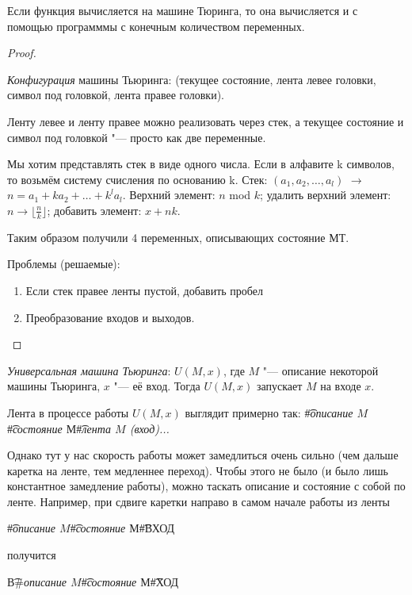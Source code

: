 \begin{theorem}
	Если функция вычисляется на машине Тюринга, то она вычисляется и с помощью программмы с конечным количеством переменных.
\end{theorem}
\begin{proof}
	\begin{Def}
		\textit{Конфигурация} машины Тьюринга: (текущее состояние, лента левее головки, символ под головкой, лента правее головки).
	\end{Def}

	Ленту левее и ленту правее можно реализовать через стек, а текущее состояние и символ под головкой "--- просто как две переменные.

	Мы хотим представлять стек в виде одного числа.
	Если в алфавите k символов, то возьмём систему счисления по основанию k.
	Стек: $(a_1, a_2, \dots, a_l)$ $\longrightarrow$ $n = a_1 + ka_2 + \dots + k^la_l$. Верхний элемент: $n$ mod $k$; удалить верхний элемент: 
	$n \longrightarrow \lfloor \frac{n}{k} \rfloor$; добавить элемент: $x + nk$.

	Таким образом получили 4 переменных, описывающих состояние МТ.

	Проблемы (решаемые):
	\begin{enumerate}
		\item Если стек правее ленты пустой, добавить пробел
		\item Преобразование входов и выходов.
	\end{enumerate} 
\end{proof}

\begin{Def}
	\textit{Универсальная машина Тьюринга}: $U(M, x)$, где $M$ "--- описание некоторой машины Тьюринга, $x$ "--- её вход.
	Тогда $U(M, x)$ запускает $M$ на входе $x$.
\end{Def}
Лента в процессе работы $U(M, x)$ выглядит примерно так: \t{\#}\textit{описание $M$}\t{\#}\textit{состояние $М$}\t{\#}\textit{лента $M$ (вход)...}

Однако тут у нас скорость работы может замедлиться очень сильно (чем дальше каретка на ленте, тем медленнее переход).
Чтобы этого не было (и было лишь константное замедление работы), можно таскать описание и состояние с собой по ленте.
Например, при сдвиге каретки направо в самом начале работы из ленты
\begin{center}
	\t{\#}\textit{описание $M$}\t{\#}\textit{состояние $М$}\t{\#ВХОД}
\end{center}
получится
\begin{center}
	\t{В\#}\textit{описание $M$}\t{\#}\textit{состояние $М$}\t{\#ХОД}
\end{center}

